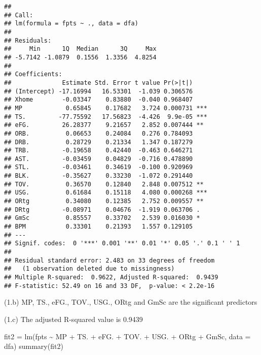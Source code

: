 \documentclass[
]{article}
\newenvironment{Shaded}{\begin{snugshade}}{\end{snugshade}}
\newcommand{\AttributeTok}[1]{\textcolor[rgb]{0.77,0.63,0.00}{#1}}
\newcommand{\FunctionTok}[1]{\textcolor[rgb]{0.00,0.00,0.00}{#1}}
\newcommand{\NormalTok}[1]{#1}
\newcommand{\OtherTok}[1]{\textcolor[rgb]{0.56,0.35,0.01}{#1}}
\newcommand{\SpecialCharTok}[1]{\textcolor[rgb]{0.00,0.00,0.00}{#1}}
\begin{document}
\begin{verbatim}
## 
## Call:
## lm(formula = fpts ~ ., data = dfa)
## 
## Residuals:
##     Min      1Q  Median      3Q     Max 
## -5.7142 -1.0879  0.1556  1.3356  4.8254 
## 
## Coefficients:
##              Estimate Std. Error t value Pr(>|t|)    
## (Intercept) -17.16994   16.53301  -1.039 0.306576    
## Xhome        -0.03347    0.83880  -0.040 0.968407    
## MP            0.65845    0.17682   3.724 0.000731 ***
## TS.         -77.75592   17.56823  -4.426  9.9e-05 ***
## eFG.         26.28377    9.21657   2.852 0.007444 ** 
## ORB.          0.06653    0.24084   0.276 0.784093    
## DRB.          0.28729    0.21334   1.347 0.187279    
## TRB.         -0.19658    0.42440  -0.463 0.646271    
## AST.         -0.03459    0.04829  -0.716 0.478890    
## STL.         -0.03461    0.34619  -0.100 0.920969    
## BLK.         -0.35627    0.33230  -1.072 0.291440    
## TOV.          0.36570    0.12840   2.848 0.007512 ** 
## USG.          0.61684    0.15118   4.080 0.000268 ***
## ORtg          0.34080    0.12385   2.752 0.009557 ** 
## DRtg         -0.08971    0.04676  -1.919 0.063706 .  
## GmSc          0.85557    0.33702   2.539 0.016030 *  
## BPM           0.33301    0.21393   1.557 0.129105    
## ---
## Signif. codes:  0 '***' 0.001 '**' 0.01 '*' 0.05 '.' 0.1 ' ' 1
## 
## Residual standard error: 2.483 on 33 degrees of freedom
##   (1 observation deleted due to missingness)
## Multiple R-squared:  0.9622, Adjusted R-squared:  0.9439 
## F-statistic: 52.49 on 16 and 33 DF,  p-value: < 2.2e-16
\end{verbatim}

(1.b) MP, TS., eFG., TOV., USG., ORtg and GmSc are the significant
predictors

(1.c) The adjusted R-squared value is 0.9439

\begin{Shaded}
\begin{Highlighting}[]
\NormalTok{fit2 }\OtherTok{=} \FunctionTok{lm}\NormalTok{(fpts }\SpecialCharTok{\textasciitilde{}}\NormalTok{ MP }\SpecialCharTok{+}\NormalTok{ TS. }\SpecialCharTok{+}\NormalTok{ eFG. }\SpecialCharTok{+}\NormalTok{ TOV. }\SpecialCharTok{+}\NormalTok{ USG. }\SpecialCharTok{+}\NormalTok{ ORtg }\SpecialCharTok{+}\NormalTok{ GmSc, }\AttributeTok{data =}\NormalTok{ dfa)}
\FunctionTok{summary}\NormalTok{(fit2)}
\end{Highlighting}
\end{Shaded}
\end{document}
